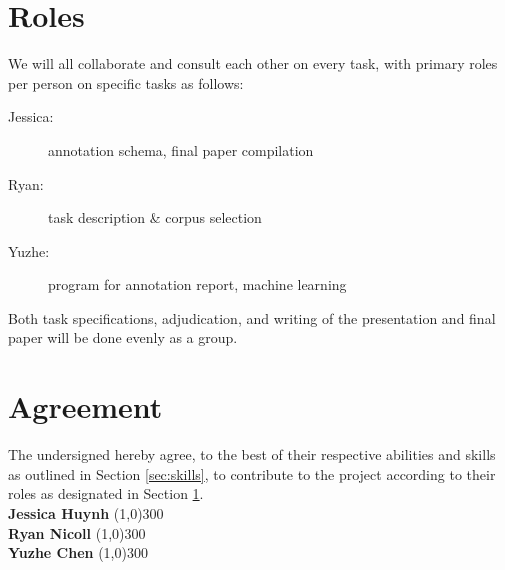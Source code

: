 \documentclass{article}
\newcommand{\groupmember}[1]{#1}
\newcommand{\role}[1]{#1}
\newcommand{\sigline}[2]{\vspace{2em} #1 \hfill \line(1,0){#2}}
\begin{document}
\section{Roles} %
\label{sec:roles}
We will all collaborate and consult each other on every task, with primary roles per person on specific tasks as follows:
\begin{description}
    \item[\role{Jessica}:] annotation schema, final paper compilation
    \item[\role{Ryan}:] task description \& corpus selection
    \item[\role{Yuzhe}:] program for annotation report, machine learning
\end{description}

Both task specifications, adjudication, and writing of the presentation and final paper will be done evenly as a group.

\pagebreak
\section{Agreement} %
\label{par:agreement}
The undersigned hereby agree, to the best of their respective abilities and skills as outlined in Section \ref{sec:skills}, to contribute to the project according to their roles as designated in Section \ref{sec:roles}.%
\vspace{2em}\\
\sigline{\textbf{\groupmember{Jessica Huynh}}}{300}\\
\sigline{\textbf{\groupmember{Ryan Nicoll}}}{300}\\
\sigline{\textbf{\groupmember{Yuzhe Chen}}}{300}\\
\end{document}
